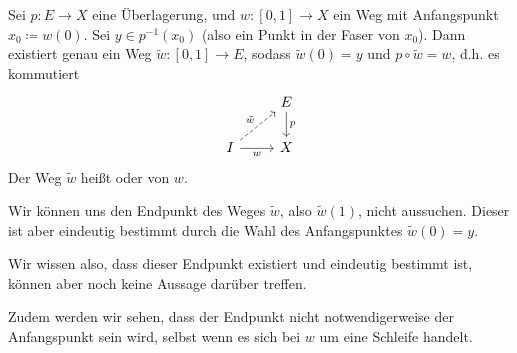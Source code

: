 
\begin{theorem}[Weghebungssatz]\label{thm:weghebungssatz}
    Sei $p\colon E \to  X$ eine Überlagerung, und $w\colon  [0,1] \to  X$ ein Weg mit Anfangspunkt $x_0\coloneqq w(0)$. Sei $y\in p^{-1} (x_0)$ (also ein Punkt in der Faser von $x_0$). Dann existiert genau ein Weg $\tilde{w}\colon  [0,1] \to  E$, sodass $\tilde{w}(0) = y$ und $p \circ  \tilde{w} = w$, d.h. es kommutiert
    \[
    \begin{tikzcd}
        & E \ar{d}{p} \\
        I \ar[dashed]{ur}{\tilde{w}} \ar[swap]{r}{w} & X
    \end{tikzcd}
    \]
    Der Weg $\tilde{w}$ heißt  oder  von $w$.  
\end{theorem}

\begin{oral}
    Wir können uns den Endpunkt des Weges $\tilde{w}$, also $\tilde{w}(1)$, nicht aussuchen. Dieser ist aber eindeutig bestimmt durch die Wahl des Anfangspunktes $\tilde{w}(0) = y$.

    Wir wissen also, dass dieser Endpunkt existiert und eindeutig bestimmt ist, können aber noch keine Aussage darüber treffen.

    Zudem werden wir sehen, dass der Endpunkt nicht notwendigerweise der Anfangspunkt sein wird, selbst wenn es sich bei $w$ um eine Schleife handelt.
\end{oral}

